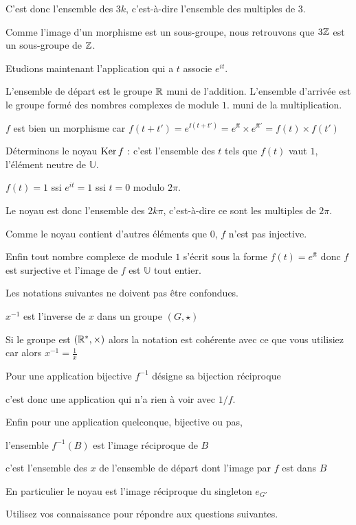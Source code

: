 C'est donc l'ensemble des $3k$, c'est-à-dire l'ensemble des multiples de $3$.

\change

Comme l'image d'un morphisme est un sous-groupe,
nous retrouvons que $3\mathbb{Z}$ est un sous-groupe de $\mathbb{Z}$.


\diapo

Etudions maintenant l'application qui a $t$ associe $e^{it}$.

L'ensemble de départ est le groupe $\mathbb{R}$ muni de l'addition.
L'ensemble d'arrivée est le groupe formé des nombres complexes de module $1$.
muni de la multiplication.


\change

$f$ est bien un morphisme car $f(t+t')=e^{\ii (t+t')}= e^{\ii t} \times e^{\ii t'} = f(t)\times f(t')$

\change

Déterminons le noyau $\mathop{\text{Ker}}\nolimits f$ : c'est l'ensemble des $t$ tels que 
$f(t)$ vaut $1$, l'élément neutre de $\mathbb{U}$.

$f(t) = 1$ ssi $e^{it}=1$ ssi $t=0$ modulo $2\pi$.

Le noyau est donc l'ensemble des $2k\pi$, c'est-à-dire ce sont les multiples de $2\pi$.

\change

Comme le noyau contient d'autres éléments que $0$, $f$ n'est pas injective.

\change

Enfin tout nombre complexe de module $1$ s'écrit sous la forme $f(t)=e^{\ii t}$
donc $f$ est surjective et l'image de $f$ est $\mathbb{U}$ tout entier.


\diapo

Les notations suivantes ne doivent pas être confondues.

\change

 $x^{-1}$ est l'inverse de $x$ dans un groupe $(G,\star)$



Si le groupe est $(\mathbb{R}^*,\times)$ alors la notation est cohérente avec ce que vous utilisiez car alors $x^{-1}=\frac 1 x$

\change

Pour une application bijective $f^{-1}$ désigne sa bijection réciproque

c'est donc une application qui n'a rien à voir avec $1/f$.

\change

Enfin pour une application quelconque, bijective ou pas,


l'ensemble $f^{-1}(B)$ est  l'image réciproque de $B$

c'est l'ensemble des $x$ de l'ensemble de départ dont l'image par $f$ est dans $B$

En particulier le noyau est l'image réciproque  du singleton $e_{G'}$

\diapo

Utilisez vos connaissance pour répondre aux questions suivantes.




